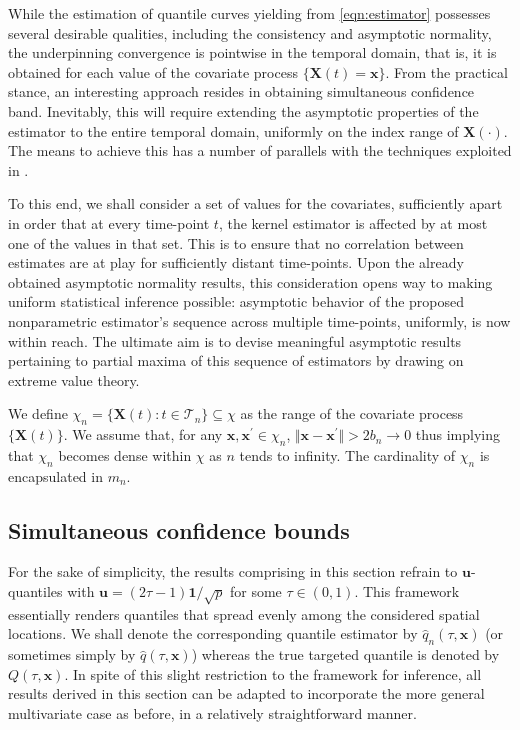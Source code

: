 \documentclass[aos]{imsart}
\theoremstyle{plain}
\theoremstyle{remark}
\newcommand{\Tcal}{\mathcal{T}}
\newcommand{\dash}{^{\prime}}
\newcommand{\bb}[1]{\boldsymbol{#1}}
\begin{document}
While the estimation of quantile curves yielding from \eqref{eqn:estimator} possesses several desirable qualities, including the consistency and asymptotic normality, the underpinning convergence is pointwise in the temporal domain, that is, it is obtained for each value of the covariate process $\{\bb{X}(t) = \bb{x}\}$. From the practical stance, an interesting approach resides in obtaining simultaneous confidence band. Inevitably, this will require extending the asymptotic properties of the estimator to the entire temporal domain, uniformly on the index range of $\bb{X}(\cdot)$. The means to achieve this has a number of parallels with the techniques exploited in \cite{zhao2008confidence}.

To this end, we shall consider a set of values for the covariates, sufficiently apart in order that at every time-point $t$, the kernel estimator is affected by at most one of the values in that set. This is to ensure that no correlation between estimates are at play for sufficiently distant time-points. Upon the already obtained asymptotic normality results, this consideration opens way to making uniform statistical inference possible: asymptotic behavior of the proposed nonparametric estimator's sequence across multiple time-points, uniformly, is now within reach. The ultimate aim is to devise meaningful asymptotic results pertaining to partial maxima of this sequence of estimators by drawing on extreme value theory.

We define $\chi_n = \{ \bb{X}(t): t \in \Tcal_n \} \subseteq \chi$ as the range of the covariate process $\{\bb{X}(t)\}$. We assume that, for any $\bb{x}, \bb{x}\dash \in \chi_n$, $\Vert \bb{x} - \bb{x}\dash\Vert > 2b_n\rightarrow 0$ thus implying that $\chi_n$ becomes dense within $\chi$ as $n$ tends to infinity. The cardinality of  $\chi_n$ is encapsulated in $m_n$.


\subsection{Simultaneous confidence bounds} 

For the sake of simplicity, the results comprising in this section refrain to $\bb{u}$-quantiles with $\bb{u} = (2\tau - 1)\bb{1}/\sqrt{p}$ for some $\tau \in (0,1)$. This framework essentially renders quantiles that spread evenly among the considered spatial locations. We shall denote the corresponding quantile estimator by $\hat{q}_n(\tau, \bb{x})$ (or sometimes simply by $\hat{q}(\tau, \bb{x})$) whereas the true targeted quantile is denoted by $Q(\tau, \bb{x})$. In spite of this slight restriction to the framework for inference, all results derived in this section can be adapted to incorporate the more general multivariate case as before, in a relatively straightforward manner.
\end{document}
